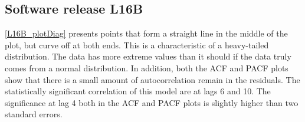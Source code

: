 \subsection{Software release L16B}

\ref{L16B_plotDiag} presents points that form a straight line in
the middle of the plot, but curve off at both ends. This is a characteristic
of a heavy-tailed distribution. The data has more extreme values than
it should if the data truly comes from a normal distribution. In addition,
both the ACF and PACF plots show that there is a small amount of autocorrelation
remain in the residuals. The statistically significant correlation
of this model are at lags 6 and 10. The significance at lag 4 both
in the ACF and PACF plots is slightly higher than two standard errors.

\begin{figure}[H]
\begin{centering}

\end{centering}
\end{figure}
